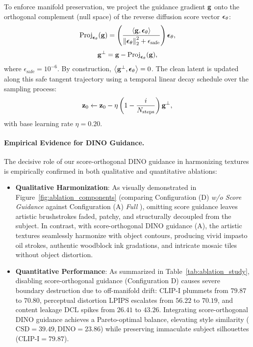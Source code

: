 To enforce manifold preservation, we project the guidance gradient $\mathbf{g}$ onto the orthogonal complement (null space) of the reverse diffusion score vector $\boldsymbol{\epsilon}_\theta$:
\begin{equation}
    \text{Proj}_{\boldsymbol{\epsilon}_\theta}(\mathbf{g}) = \left( \frac{\left\langle \mathbf{g}, \boldsymbol{\epsilon}_\theta \right\rangle}{\left\lVert\boldsymbol{\epsilon}_\theta\right\rVert_2^2 + \epsilon_{\text{safe}}} \right) \boldsymbol{\epsilon}_\theta,
\end{equation}
\begin{equation}
    \mathbf{g}^\perp = \mathbf{g} - \text{Proj}_{\boldsymbol{\epsilon}_\theta}(\mathbf{g}),
    \label{eq:score_ortho_proj}
\end{equation}
where $\epsilon_{\text{safe}} = 10^{-6}$. By construction, $\left\langle \mathbf{g}^\perp, \boldsymbol{\epsilon}_\theta \right\rangle = 0$. The clean latent is updated along this safe tangent trajectory using a temporal linear decay schedule over the sampling process:
\begin{equation}
    \mathbf{z}_0 \leftarrow \mathbf{z}_0 - \eta \left( 1 - \frac{i}{N_{\text{steps}}} \right) \mathbf{g}^\perp,
    \label{eq:latent_update}
\end{equation}
with base learning rate $\eta = 0.20$.

\paragraph{Empirical Evidence for DINO Guidance.}
The decisive role of our score-orthogonal DINO guidance in harmonizing textures is empirically confirmed in both qualitative and quantitative ablations:
\begin{itemize}
    \item \textbf{Qualitative Harmonization}: As visually demonstrated in Figure~\ref{fig:ablation_components} (comparing Configuration (D) \textit{w/o Score Guidance} against Configuration (A) \textit{Full \method}), omitting score guidance leaves artistic brushstrokes faded, patchy, and structurally decoupled from the subject. In contrast, with score-orthogonal DINO guidance (A), the artistic textures seamlessly harmonize with object contours, producing vivid impasto oil strokes, authentic woodblock ink gradations, and intricate mosaic tiles without object distortion.
    \item \textbf{Quantitative Performance}: As summarized in Table~\ref{tab:ablation_study}, disabling score-orthogonal guidance (Configuration D) causes severe boundary destruction due to off-manifold drift: $\text{CLIP-I}$ plummets from $79.87$ to $70.80$, perceptual distortion $\text{LPIPS}$ escalates from $56.22$ to $70.19$, and content leakage $\text{DCL}$ spikes from $26.41$ to $43.26$. Integrating score-orthogonal DINO guidance achieves a Pareto-optimal balance, elevating style similarity ($\text{CSD} = 39.49, \text{DINO} = 23.86$) while preserving immaculate subject silhouettes ($\text{CLIP-I} = 79.87$).
\end{itemize}

